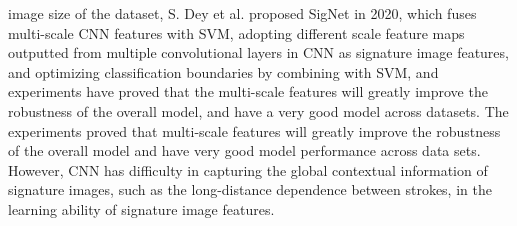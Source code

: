 image size of the dataset, S. Dey et al. proposed SigNet \cite{32} in 2020, which fuses multi-scale CNN features with SVM, adopting different scale feature maps outputted from multiple convolutional layers in CNN as signature image features, and optimizing classification boundaries by combining with SVM, and experiments have proved that the multi-scale features will greatly improve the robustness of the overall model, and have a very good model across datasets. The experiments proved that multi-scale features will greatly improve the robustness of the overall model and have very good model performance across data sets. However, CNN has difficulty in capturing the global contextual information of signature images, such as the long-distance dependence between strokes, in the learning ability of signature image features.

